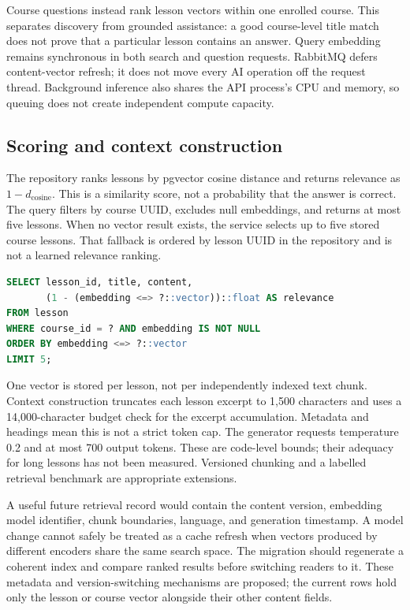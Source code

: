 \documentclass[12pt,a4paper,oneside]{report}
\begin{document}
Course questions instead rank lesson vectors within one enrolled course. This
separates discovery from grounded assistance: a good course-level title match does
not prove that a particular lesson contains an answer. Query embedding remains
synchronous in both search and question requests. RabbitMQ defers content-vector
refresh; it does not move every AI operation off the request thread. Background
inference also shares the API process's CPU and memory, so queuing does not create
independent compute capacity.

\subsection{Scoring and context construction}
The repository ranks lessons by pgvector cosine distance and returns relevance as
$1-d_{\mathrm{cosine}}$. This is a similarity score, not a probability that the answer
is correct. The query filters by course UUID, excludes null embeddings, and returns
at most five lessons. When no vector result exists, the service selects up to five
stored course lessons. That fallback is ordered by lesson UUID in the repository and
is not a learned relevance ranking.

\begin{lstlisting}[language=SQL,caption={Course-scoped retrieval implemented by the repository}]
SELECT lesson_id, title, content,
       (1 - (embedding <=> ?::vector))::float AS relevance
FROM lesson
WHERE course_id = ? AND embedding IS NOT NULL
ORDER BY embedding <=> ?::vector
LIMIT 5;
\end{lstlisting}

One vector is stored per lesson, not per independently indexed text chunk. Context
construction truncates each lesson excerpt to 1,500 characters and uses a 14,000-character
budget check for the excerpt accumulation. Metadata and headings mean this is not a
strict token cap. The generator requests temperature 0.2 and at most 700 output tokens.
These are code-level bounds; their adequacy for long lessons has not been measured.
Versioned chunking and a labelled retrieval benchmark are appropriate extensions.

A useful future retrieval record would contain the content version, embedding model
identifier, chunk boundaries, language, and generation timestamp. A model change
cannot safely be treated as a cache refresh when vectors produced by different
encoders share the same search space. The migration should regenerate a coherent
index and compare ranked results before switching readers to it. These metadata and
version-switching mechanisms are proposed; the current rows hold only the lesson or
course vector alongside their other content fields.
\end{document}
